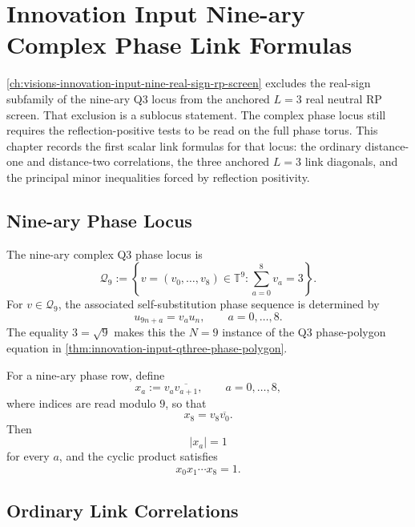 \chapter{Innovation Input Nine-ary Complex Phase Link Formulas}
\label{ch:visions-innovation-input-nine-complex-phase-link-formulas}

\autoref{ch:visions-innovation-input-nine-real-sign-rp-screen} excludes
the real-sign subfamily of the nine-ary Q3 locus from the anchored
$L=3$ real neutral RP screen. That exclusion is a sublocus statement. The
complex phase locus still requires the reflection-positive tests to be
read on the full phase torus. This chapter records the first scalar
link formulas for that locus: the ordinary distance-one and distance-two
correlations, the three anchored $L=3$ link diagonals, and the principal
minor inequalities forced by reflection positivity.

\section{Nine-ary Phase Locus}
\label{sec:innovation-input-nine-complex-phase-locus}

\begin{definition}
\label{def:innovation-input-nine-complex-qthree-phase-row}
The nine-ary complex Q3 phase locus is
$$
\mathcal Q_9
:=
\left\{
v=(v_0,\ldots,v_8)\in\mathbb T^9:
\sum_{a=0}^{8}v_a=3
\right\}.
$$
For $v\in\mathcal Q_9$, the associated self-substitution phase sequence
is determined by
$$
u_{9n+a}=v_a u_n,
\qquad
a=0,\ldots,8.
$$
The equality $3=\sqrt9$ makes this the $N=9$ instance of the Q3
phase-polygon equation in
\autoref{thm:innovation-input-qthree-phase-polygon}.
\end{definition}

\begin{definition}
\label{def:innovation-input-nine-complex-edge-ratios}
For a nine-ary phase row, define
$$
x_a:=v_a\overline{v_{a+1}},
\qquad
a=0,\ldots,8,
$$
where indices are read modulo $9$, so that
$$
x_8=v_8\overline{v_0}.
$$
Then
$$
|x_a|=1
$$
for every $a$, and the cyclic product satisfies
$$
x_0x_1\cdots x_8=1.
$$
\end{definition}

\section{Ordinary Link Correlations}
\label{sec:innovation-input-nine-complex-ordinary-link-correlations}

